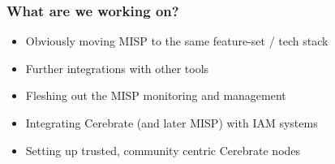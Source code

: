 \begin{frame}
	\frametitle{What are we working on?}
	\begin{itemize}
                \item Obviously moving MISP to the same feature-set / tech stack
                \item Further integrations with other tools
                \item Fleshing out the MISP monitoring and management
                \item Integrating Cerebrate (and later MISP) with IAM systems
                \item Setting up trusted, community centric Cerebrate nodes
	\end{itemize}
\end{frame}
